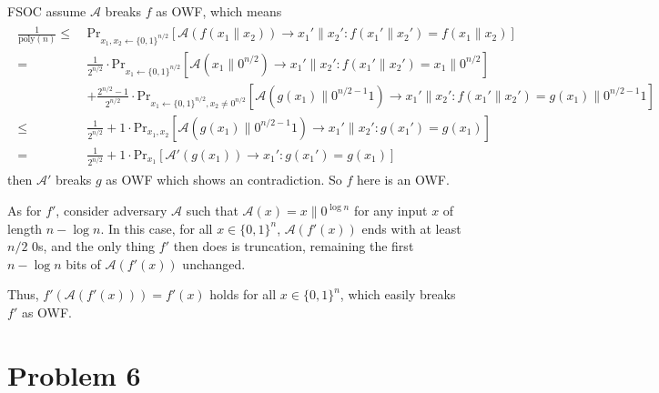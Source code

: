 \documentclass[8pt]{article}
\theoremstyle{compact}
\def\le{\leqslant}
\begin{document}
FSOC assume $\mathcal A$ breaks $f$ as OWF, which means
\begin{align*}
	\begin{split}
		\frac{1}{\text{poly}(n)} \le \ & \text{Pr}_{x_1, x_2 \gets \{0, 1\}^{n/2}}\left[\mathcal A(f(x_1 \| x_2)) \to x_1' \| x_2': f(x_1' \| x_2') = f(x_1 \| x_2)\right] \\
		= \ & \frac{1}{2^{n/2}}\cdot\text{Pr}_{x_1 \gets \{0, 1\}^{n/2}}\left[\mathcal A(x_1 \| 0^{n/2}) \to x_1' \| x_2': f(x_1' \| x_2') = x_1 \| 0^{n/2}\right] \\
		& + \frac{2^{n/2}-1}{2^{n/2}}\cdot\text{Pr}_{x_1 \gets \{0, 1\}^{n/2}, x_2 \neq 0^{n/2}}\left[\mathcal A(g(x_1) \| 0^{n/2-1}1) \to x_1' \| x_2': f(x_1' \| x_2') = g(x_1) \| 0^{n/2-1}1\right] \\
		\le \ & \frac{1}{2^{n/2}} + 1 \cdot \text{Pr}_{x_1, x_2}\left[\mathcal A(g(x_1) \| 0^{n/2-1}1) \to x_1' \| x_2': g(x_1') = g(x_1)\right] \\
		= \ & \frac{1}{2^{n/2}} + 1 \cdot \text{Pr}_{x_1}\left[\mathcal A'(g(x_1)) \to x_1' : g(x_1') = g(x_1)\right]
	\end{split}
\end{align*}
then $\mathcal A'$ breaks $g$ as OWF which shows an contradiction. So $f$ here is an OWF.

As for $f'$, consider adversary $\mathcal A$ such that $\mathcal A(x) = x \| 0^{\log n}$ for any input $x$ of length $n - \log n$. In this case, for all $x \in \{0, 1\}^n$, $\mathcal A(f'(x))$ ends with at least $n/2$ 0s, and the only thing $f'$ then does is truncation, remaining the first $n - \log n$ bits of $\mathcal A(f'(x))$ unchanged.

Thus, $f'(\mathcal A(f'(x))) = f'(x)$ holds for all $x \in \{0, 1\}^n$, which easily breaks $f'$ as OWF.
\section*{Problem 6}
\end{document}
